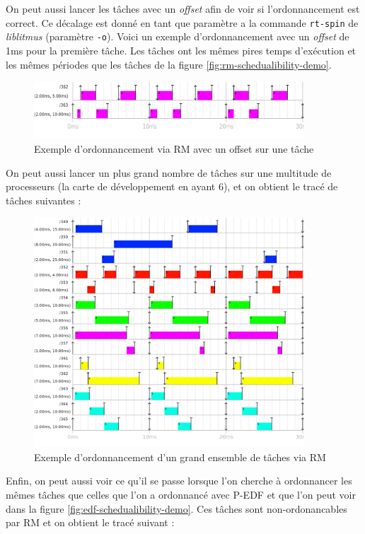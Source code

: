 On peut aussi lancer les tâches avec un \textit{offset} afin de voir si l'ordonnancement est correct. Ce décalage est donné en tant que paramètre a la commande \texttt{rt-spin} de \textit{liblitmus} (paramètre \texttt{-o}). Voici un exemple d'ordonnancement avec un \textit{offset} de 1ms pour la première tâche. Les tâches ont les mêmes pires temps d'exécution et les mêmes périodes que les tâches de la figure \ref{fig:rm-schedualibility-demo}.
\begin{figure}[H]
    \centering
    \includegraphics[width=0.9\textwidth]{Images/RM_OFFSET_SCHED.png}
    \caption{Exemple d'ordonnancement via RM avec un offset sur une tâche}
\end{figure}

On peut aussi lancer un plus grand nombre de tâches sur une multitude de processeurs (la carte de développement en ayant 6), et on obtient le tracé de tâches suivantes : 

\begin{figure}[H]
    \centering
    \includegraphics[width=0.9\textwidth]{Images/RM-bcp.png}
    \caption{Exemple d'ordonnancement d'un grand ensemble de tâches via RM}
\end{figure}


Enfin, on peut aussi voir ce qu'il se passe lorsque l'on cherche à ordonnancer les mêmes tâches que celles que l'on a ordonnancé avec P-EDF et que l'on peut voir dans la figure \ref{fig:edf-schedualibility-demo}. Ces tâches sont non-ordonancables par RM et on obtient le tracé suivant :

